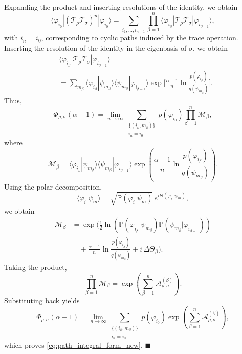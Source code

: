 \documentclass[a4paper, amsfonts, amssymb, amsmath, reprint, showkeys, nofootinbib, twoside, aps, pra]{revtex4-2}
\theoremstyle{definition}
\renewenvironment{proof}{\noindent{\bfseries Proof.}}{\hfill$\blacksquare$}
\begin{document}
\begin{proof}
Expanding the product and inserting resolutions of the identity, we obtain
\begin{equation}
\langle\varphi_{i_0}|(\mathcal{T}_\rho \mathcal{T}_\sigma)^n|\varphi_{i_0}\rangle
=
\sum_{i_1,\dots,i_{n-1}}
\prod_{\beta=1}^n
\langle\varphi_{i_\beta}|
\mathcal{T}_\rho\mathcal{T}_\sigma
|\varphi_{i_{\beta-1}}\rangle,
\end{equation}
with \(i_n=i_0\), corresponding to cyclic paths induced by the trace operation. Inserting the resolution of the identity in the eigenbasis of \(\sigma\), we obtain
\begin{equation}
\begin{aligned}
&\langle\varphi_{i_\beta}| \mathcal{T}_\rho \mathcal{T}_\sigma |\varphi_{i_{\beta-1}}\rangle \\
&= \sum_{m_\beta} \langle\varphi_{i_\beta}|\psi_{m_\beta}\rangle \langle\psi_{m_\beta}|\varphi_{i_{\beta-1}}\rangle \exp\Biggl[ \frac{\alpha-1}{n} \ln \frac{p(\varphi_{i_\beta})}{q(\psi_{m_\beta})} \Biggr].
\end{aligned}
\end{equation}
Thus,
\begin{equation}
\Phi_{\rho,\sigma}(\alpha-1)
=
\lim_{n\to\infty}
\sum_{\substack{\{(i_\beta,m_\beta)\} \\ i_n=i_0}}
p(\varphi_{i_0})
\prod_{\beta=1}^n
\mathcal{M}_\beta,
\end{equation}
where
\begin{equation}
\mathcal{M}_\beta=\langle\varphi_{i_\beta}|\psi_{m_\beta}\rangle
\langle\psi_{m_\beta}|\varphi_{i_{\beta-1}}\rangle\exp\!\left(
\frac{\alpha-1}{n}\ln\frac{p(\varphi_{i_\beta})}{q(\psi_{m_\beta})}
\right).
\end{equation}
Using the polar decomposition,
\begin{equation}
\langle\varphi_i|\psi_m\rangle = \sqrt{\mathbb{P}(\varphi_i|\psi_m)}\,e^{i\Theta(\varphi_i,\psi_m)},
\end{equation}
we obtain
\begin{equation}
\begin{aligned}
\mathcal{M}_\beta 
&= \exp\Biggl( \frac{1}{2}\ln\left( \mathbb{P}(\varphi_{i_\beta}|\psi_{m_\beta})\mathbb{P}(\psi_{m_\beta}|\varphi_{i_{\beta-1}})\right) \\
&\quad + \frac{\alpha-1}{n} \ln\frac{p(\varphi_{i_\beta})}{q(\psi_{m_\beta})} + i\,\Delta\Theta_\beta \Biggr).
\end{aligned}
\end{equation}
Taking the product,
\begin{equation}
\prod_{\beta=1}^n \mathcal{M}_\beta =\exp\!\left(\sum_{\beta=1}^n
\mathcal{A}_{\rho,\sigma}^{(\beta)}\right).
\end{equation}
Substituting back yields
\begin{equation}
\Phi_{\rho,\sigma}(\alpha-1)=\lim_{n\to\infty}\sum_{\substack{\{(i_\beta,m_\beta)\} \\ i_n=i_0}}p(\varphi_{i_0})\exp\!\left(
\sum_{\beta=1}^n\mathcal{A}_{\rho,\sigma}^{(\beta)}\right),
\end{equation}
which proves \eqref{eq:path_integral_form_new}.
\end{proof}
\end{document}
